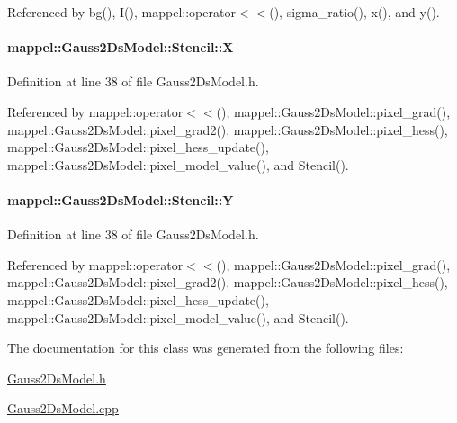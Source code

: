 Referenced by bg(), I(), mappel\+::operator$<$$<$(), sigma\+\_\+ratio(), x(), and y().

\paragraph[{\texorpdfstring{X}{X}}]{ mappel\+::\+Gauss2\+Ds\+Model\+::\+Stencil\+::X}\hypertarget{classmappel_1_1Gauss2DsModel_1_1Stencil_a497039e1c31ac5764e03585d0b5d2cd7}{}\label{classmappel_1_1Gauss2DsModel_1_1Stencil_a497039e1c31ac5764e03585d0b5d2cd7}


Definition at line 38 of file Gauss2\+Ds\+Model.\+h.



Referenced by mappel\+::operator$<$$<$(), mappel\+::\+Gauss2\+Ds\+Model\+::pixel\+\_\+grad(), mappel\+::\+Gauss2\+Ds\+Model\+::pixel\+\_\+grad2(), mappel\+::\+Gauss2\+Ds\+Model\+::pixel\+\_\+hess(), mappel\+::\+Gauss2\+Ds\+Model\+::pixel\+\_\+hess\+\_\+update(), mappel\+::\+Gauss2\+Ds\+Model\+::pixel\+\_\+model\+\_\+value(), and Stencil().

\paragraph[{\texorpdfstring{Y}{Y}}]{ mappel\+::\+Gauss2\+Ds\+Model\+::\+Stencil\+::Y}\hypertarget{classmappel_1_1Gauss2DsModel_1_1Stencil_a5109bf95a111bfe16a56c232dcb96071}{}\label{classmappel_1_1Gauss2DsModel_1_1Stencil_a5109bf95a111bfe16a56c232dcb96071}


Definition at line 38 of file Gauss2\+Ds\+Model.\+h.



Referenced by mappel\+::operator$<$$<$(), mappel\+::\+Gauss2\+Ds\+Model\+::pixel\+\_\+grad(), mappel\+::\+Gauss2\+Ds\+Model\+::pixel\+\_\+grad2(), mappel\+::\+Gauss2\+Ds\+Model\+::pixel\+\_\+hess(), mappel\+::\+Gauss2\+Ds\+Model\+::pixel\+\_\+hess\+\_\+update(), mappel\+::\+Gauss2\+Ds\+Model\+::pixel\+\_\+model\+\_\+value(), and Stencil().



The documentation for this class was generated from the following files\+:\begin{DoxyCompactItemize}
\item 
\hyperlink{Gauss2DsModel_8h}{Gauss2\+Ds\+Model.\+h}\item 
\hyperlink{Gauss2DsModel_8cpp}{Gauss2\+Ds\+Model.\+cpp}\end{DoxyCompactItemize}
